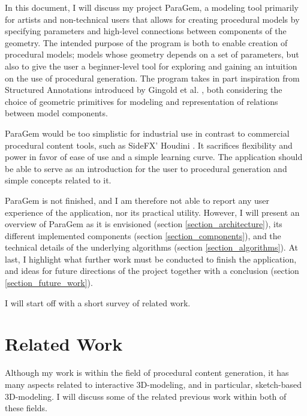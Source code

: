 \documentclass[english]{article}
\begin{document}
In this document, I will discuss my project ParaGem, a modeling tool primarily for artists and non-technical users that allows for creating procedural models by specifying parameters and high-level connections between components of the geometry. The intended purpose of the program is both to enable creation of procedural models; models whose geometry depends on a set of parameters, but also to give the user a beginner-level tool for exploring and gaining an intuition on the use of procedural generation. The program takes in part inspiration from Structured Annotations introduced by Gingold et al. \cite{gingold09}, both considering the choice of geometric primitives for modeling and representation of relations between model components.

ParaGem would be too simplistic for industrial use in contrast to commercial procedural content tools, such as SideFX' Houdini \cite{houdini}. It sacrifices flexibility and power in favor of ease of use and a simple learning curve. The application should be able to serve as an introduction for the user to procedural generation and simple concepts related to it.


ParaGem is not finished, and I am therefore not able to report any user experience of the application, nor its practical utility. However, I will present an overview of ParaGem as it is envisioned (section \ref{section_architecture}), its different implemented components (section \ref{section_components}), and the technical details of the underlying algorithms (section \ref{section_algorithms}). At last, I highlight what further work must be conducted to finish the application, and ideas for future directions of the project together with a conclusion (section \ref{section_future_work}).

I will start off with a short survey of related work.

\pagebreak

\section{Related Work} \label{related_work}

Although my work is within the field of procedural content generation, it has many aspects related to interactive 3D-modeling, and in particular, sketch-based 3D-modeling. I will discuss some of the related previous work within both of these fields.
\end{document}
